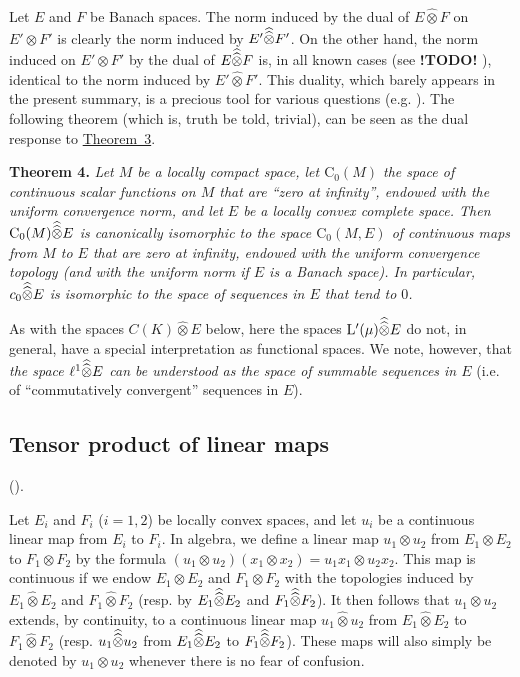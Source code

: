\documentclass{article}
\theoremstyle{plain}
\newenvironment{itenv}[1]
  {\phantomsection\par\medskip\noindent\textbf{#1.}\itshape}
  {\medskip}
\newcommand{\LL}{\mathrm{L}}
\newcommand{\CC}{\mathrm{C}}
\renewcommand{\ll}{\ell}
\newcommand{\hotimes}{\widehat{\otimes}}
\newcommand{\hhotimes}{\skew{0}{\widehat}{\skew{0}\widehat{\otimes}}}
\newcommand{\todo}{\textbf{ !TODO! }}
\newcommand{\oldpage}[1]{\marginpar{\footnotesize$\Big\vert$ \textit{p.~#1}}}
\begin{document}
Let $E$ and $F$ be Banach spaces.
The norm induced by the dual of $E\hotimes F$ on $E'\otimes F'$ is clearly the norm induced by $E'\hhotimes F'$.
On the other hand, the norm induced on $E'\otimes F'$ by the dual of $E\hhotimes F$ is, in all known cases (see \todo), identical to the norm induced by $E'\hotimes F'$.
This duality, which barely appears in the present summary, is a precious tool for various questions
\oldpage{83}
(e.g. \cite[chap.~I, \S4, n\textsuperscript{o}~6]{PTT}).
The following theorem (which is, truth be told, trivial), can be seen as the dual response to \hyperref[1.theorem3]{Theorem~3}.

\begin{itenv}{Theorem 4}
\label{1.theorem4}
  Let $M$ be a locally compact space, let $\CC_0(M)$ the space of continuous scalar functions on $M$ that are ``zero at infinity'', endowed with the uniform convergence norm, and let $E$ be a locally convex complete space.
  Then $\CC_0(M)\hhotimes E$ is canonically isomorphic to the space $\CC_0(M,E)$ of continuous maps from $M$ to $E$ that are zero at infinity, endowed with the uniform convergence topology (and with the uniform norm if $E$ is a Banach space).
  In particular, $c_0\hhotimes E$ is isomorphic to the space of sequences in $E$ that tend to $0$.
\end{itenv}

As with the spaces $C(K)\hotimes E$ below, here the spaces $\LL'(\mu)\hhotimes E$ do not, in general, have a special interpretation as functional spaces.
We note, however, that \emph{the space $\ll^1\hhotimes E$ can be understood as the space of summable sequences in $E$} (i.e. of ``commutatively convergent'' sequences in $E$).


\subsection{Tensor product of linear maps}
\label{1.6}

(\cite[chap.~1, \S1, n\textsuperscript{o}~2]{PTT}).
\medskip

Let $E_i$ and $F_i$ ($i=1,2$) be locally convex spaces, and let $u_i$ be a continuous linear map from $E_i$ to $F_i$.
In algebra, we define a linear map $u_1\otimes u_2$ from $E_1\otimes E_2$ to $F_1\otimes F_2$ by the formula $(u_1\otimes u_2)(x_1\otimes x_2)=u_1x_1\otimes u_2x_2$.
This map is continuous if we endow $E_1\otimes E_2$ and $F_1\otimes F_2$ with the topologies induced by $E_1\hotimes E_2$ and $F_1\hotimes F_2$ (resp. by $E_1\hhotimes E_2$ and $F_1\hhotimes F_2$).
It then follows that $u_1\otimes u_2$ extends, by continuity, to a continuous linear map $u_1\hotimes u_2$ from $E_1\hotimes E_2$ to $F_1\hotimes F_2$ (resp. $u_1\hhotimes u_2$ from $E_1\hhotimes E_2$ to $F_1\hhotimes F_2$).
These maps will also simply be denoted by $u_1\otimes u_2$ whenever there is no fear of confusion.
\end{document}
